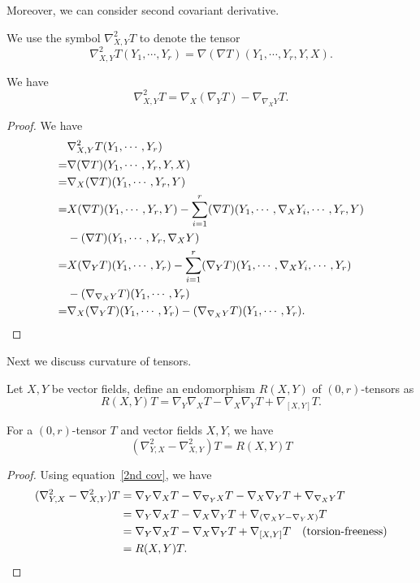 Moreover, we can consider second covariant derivative.
\begin{symb}
    We use the symbol $\nabla^2_{X,Y}T$ to denote the tensor 
    \[\nabla^2_{X,Y}T(Y_1,\cdots,Y_r)=\nabla(\nabla T)(Y_1,\cdots,Y_r,Y,X).\]
\end{symb}

\begin{prop}
    We have
    \begin{equation}
        \nabla^2_{X,Y}T=\nabla_X(\nabla_YT)-\nabla_{\nabla_XY}T.\label{2nd cov}
    \end{equation}
\end{prop}
\begin{proof}
    We have
    \begin{align*}
        &\nabla^2_{X,Y}T(Y_1,\cdots,Y_r)\\
        =&\nabla(\nabla T)(Y_1,\cdots,Y_r,Y,X)\\
        =&\nabla_X(\nabla T)(Y_1,\cdots,Y_r,Y)\\
        =&X(\nabla T)(Y_1,\cdots,Y_r,Y)-\sum_{i=1}^r(\nabla T)(Y_1,\cdots,\nabla_XY_i,\cdots,Y_r,Y)\\
        &-(\nabla T)(Y_1,\cdots,Y_r,\nabla_XY)\\
        =&X(\nabla_YT)(Y_1,\cdots,Y_r)-\sum_{i=1}^r(\nabla_YT)(Y_1,\cdots,\nabla_XY_i,\cdots,Y_r)\\
        &-(\nabla_{\nabla_XY}T)(Y_1,\cdots,Y_r)\\
        =&\nabla_X(\nabla_YT)(Y_1,\cdots,Y_r)-(\nabla_{\nabla_XY}T)(Y_1,\cdots,Y_r).\qedhere
    \end{align*}
\end{proof}

Next we discuss curvature of tensors.

\begin{defn}
    Let $X,Y$ be vector fields, define an endomorphism $R(X,Y)$ of $(0,r)$-tensors as
    \[R(X,Y)T=\nabla_Y\nabla_XT-\nabla_X\nabla_YT+\nabla_{[X,Y]}T.\]
\end{defn}

\begin{prop}
    For a $(0,r)$-tensor $T$ and vector fields $X,Y$, we have
    \[(\nabla^2_{Y,X}-\nabla^2_{X,Y})T=R(X,Y)T\]
\end{prop}
\begin{proof}
    Using equation~\ref{2nd cov}, we have
    \begin{align*}
        (\nabla^2_{Y,X}-\nabla^2_{X,Y})T&=\nabla_Y\nabla_XT-\nabla_{\nabla_YX}T-\nabla_X\nabla_YT+\nabla_{\nabla_XY}T\\
        &=\nabla_Y\nabla_XT-\nabla_X\nabla_YT+\nabla_{(\nabla_XY-\nabla_YX)}T\\
        &=\nabla_Y\nabla_XT-\nabla_X\nabla_YT+\nabla_{[X,Y]}T\quad\text{(torsion-freeness)}\\
        &=R(X,Y)T.\qedhere
    \end{align*}
\end{proof}


